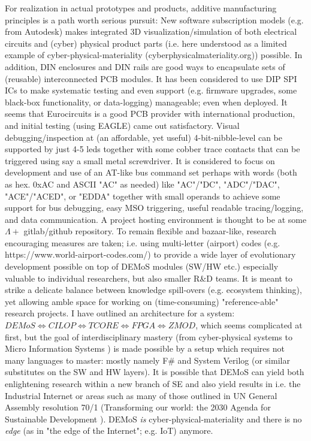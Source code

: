 \documentclass[11pt]{article}
\begin{document}
 For realization in actual prototypes and products, additive manufacturing principles is a path worth serious pursuit: New software subscription models (e.g. from Autodesk) makes integrated 3D visualization/simulation of both electrical circuits and (cyber) physical product parts (i.e. here understood as a limited example of cyber-physical-materiality (cyberphysicalmateriality.org)) possible. In addition, DIN enclosures and DIN rails are good ways to encapsulate sets of (reusable) interconnected PCB modules. It has been considered to use DIP SPI ICs to make systematic testing and even support (e.g. firmware upgrades, some black-box functionality, or data-logging) manageable; even when deployed. It seems that Eurocircuits is a good PCB provider with international production, and initial testing (using EAGLE) came out satisfactory. Visual debugging/inspection at (an affordable, yet useful) 4-bit-nibble-level can be supported by just 4-5 leds together with some cobber trace contacts that can be triggered using say a small metal screwdriver. It is considered to focus on development and use of an AT-like bus command set perhaps with words (both as hex. 0xAC and ASCII "AC" as needed) like "AC"/"DC", "ADC"/"DAC", "ACE"/"ACED", or "EDDA" together with small operands to achieve some support for bus debugging, easy MSO triggering, useful readable tracing/logging, and data communication. A project hosting environment is thought to be at some \(\Lambda+\) gitlab/github repository. To remain flexible and bazaar-like, research encouraging measures are taken; i.e. using multi-letter (airport) codes (e.g. https://www.world-airport-codes.com/) to provide a wide layer of evolutionary development possible on top of DEMoS modules (SW/HW etc.) especially valuable to individual researchers, but also smaller R\&D teams. It is meant to strike a delicate balance between knowledge spill-overs (e.g. ecosystem thinking), yet allowing amble space for working on (time-consuming) "reference-able" research projects.
 I have outlined an architecture for a system:\\
 $DEMoS \Leftrightarrow CILOP \Leftrightarrow TCORE \Leftrightarrow FPGA \Leftrightarrow ZMOD$, which seems complicated at first, but the goal of interdisciplinary mastery (from cyber-physical systems \cite{Lee2008} to Micro Information Systems \cite{Pedersen2010}) is made possible by a setup which requires not many languages to master: mostly namely F\# and System Verilog (or similar substitutes on the SW and HW layers). It is possible that DEMoS can yield both enlightening research within a new branch of SE and also yield results in i.e. the Industrial Internet or areas such as many of those outlined in UN General Assembly resolution 70/1 (Transforming our world: the 2030 Agenda for Sustainable Development \cite{UN2015}). DEMoS \textit{is} cyber-physical-materiality and there is no \textit{edge} (as in "the edge of the Internet"; e.g. IoT) anymore.




\end{document}
